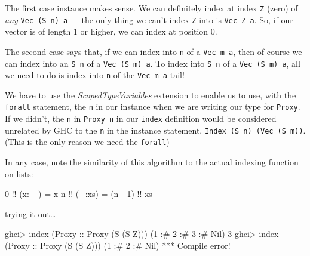 \documentclass[]{article}
\newenvironment{Shaded}{}{}
\newcommand{\DataTypeTok}[1]{\textcolor[rgb]{0.56,0.13,0.00}{#1}}
\newcommand{\DecValTok}[1]{\textcolor[rgb]{0.25,0.63,0.44}{#1}}
\newcommand{\FunctionTok}[1]{\textcolor[rgb]{0.02,0.16,0.49}{#1}}
\newcommand{\NormalTok}[1]{#1}
\newcommand{\OtherTok}[1]{\textcolor[rgb]{0.00,0.44,0.13}{#1}}
\begin{document}
The first case instance makes sense. We can definitely index at index \texttt{Z}
(zero) of \emph{any} \texttt{Vec\ (S\ n)\ a} --- the only thing we can't index
\texttt{Z} into is \texttt{Vec\ Z\ a}. So, if our vector is of length 1 or
higher, we can index at position 0.

The second case says that, if we can index into \texttt{n} of a
\texttt{Vec\ m\ a}, then of course we can index into an \texttt{S\ n} of a
\texttt{Vec\ (S\ m)\ a}. To index into \texttt{S\ n} of a
\texttt{Vec\ (S\ m)\ a}, all we need to do is index into \texttt{n} of the
\texttt{Vec\ m\ a} tail!

We have to use the \emph{ScopedTypeVariables} extension to enable us to use,
with the \texttt{forall} statement, the \texttt{n} in our instance when we are
writing our type for \texttt{Proxy}. If we didn't, the \texttt{n} in
\texttt{Proxy\ n} in our \texttt{index} definition would be considered unrelated
by GHC to the \texttt{n} in the instance statement,
\texttt{Index\ (S\ n)\ (Vec\ (S\ m))}. (This is the only reason we need the
\texttt{forall})

In any case, note the similarity of this algorithm to the actual indexing
function on lists:

\begin{Shaded}
\begin{Highlighting}[]
\DecValTok{0} \FunctionTok{!!}\NormalTok{ (x}\FunctionTok{:}\NormalTok{_ ) }\FunctionTok{=}\NormalTok{ x}
\NormalTok{n }\FunctionTok{!!}\NormalTok{ (_}\FunctionTok{:}\NormalTok{xs) }\FunctionTok{=}\NormalTok{ (n }\FunctionTok{-} \DecValTok{1}\NormalTok{) }\FunctionTok{!!}\NormalTok{ xs}
\end{Highlighting}
\end{Shaded}

trying it out\ldots{}

\begin{Shaded}
\begin{Highlighting}[]
\NormalTok{ghci}\FunctionTok{>}\NormalTok{ index (}\DataTypeTok{Proxy}\OtherTok{ ::} \DataTypeTok{Proxy}\NormalTok{ (}\DataTypeTok{S}\NormalTok{ (}\DataTypeTok{S} \DataTypeTok{Z}\NormalTok{))) (}\DecValTok{1} \FunctionTok{:#} \DecValTok{2} \FunctionTok{:#} \DecValTok{3} \FunctionTok{:#} \DataTypeTok{Nil}\NormalTok{)}
\DecValTok{3}
\NormalTok{ghci}\FunctionTok{>}\NormalTok{ index (}\DataTypeTok{Proxy}\OtherTok{ ::} \DataTypeTok{Proxy}\NormalTok{ (}\DataTypeTok{S}\NormalTok{ (}\DataTypeTok{S} \DataTypeTok{Z}\NormalTok{))) (}\DecValTok{1} \FunctionTok{:#} \DecValTok{2} \FunctionTok{:#} \DataTypeTok{Nil}\NormalTok{)}
\FunctionTok{***} \DataTypeTok{Compile}\NormalTok{ error}\FunctionTok{!}
\end{Highlighting}
\end{Shaded}
\end{document}
